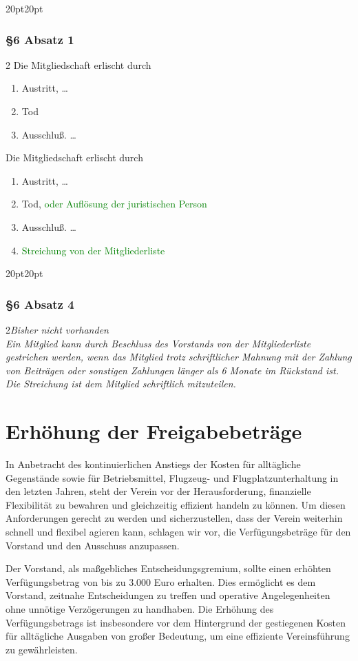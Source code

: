 \documentclass[10pt,a4paper,parskip=half]{scrartcl}
\newcommand{\new}[1]{\textcolor{Green}{#1}}
\newcommand{\change}[1]{
  \begin{adjustwidth}{20pt}{20pt}
    #1
  \end{adjustwidth}
}
\newcommand{\compare}[3]{\change{\subsubsection*{#1}\begin{multicols}{2}#2\columnbreak\\#3\end{multicols}}}
\begin{document}
  \change{
  \subsubsection*{§6 Absatz 1}
  \begin{multicols}{2}
  Die Mitgliedschaft erlischt durch
  \begin{enumerate}[label=\alph*)]
    \item Austritt, \dots
    \item Tod
    \item{Ausschluß.} \dots
  \end{enumerate}
  \columnbreak
  Die Mitgliedschaft erlischt durch
  \begin{enumerate}[label=\alph*)]
    \item Austritt, \dots
    \item Tod, \new{oder Auflösung der juristischen Person}
    \item{Ausschluß.} \dots
    \item \new{Streichung von der Mitgliederliste}
  \end{enumerate}
\end{multicols}
  }
\compare{§6 Absatz 4}{\em Bisher nicht vorhanden \em}{Ein Mitglied kann durch Beschluss des Vorstands von der Mitgliederliste gestrichen werden,
wenn das Mitglied trotz schriftlicher Mahnung mit der Zahlung von Beiträgen oder sonstigen Zahlungen länger als 6 Monate im Rückstand ist.
Die Streichung ist dem Mitglied schriftlich mitzuteilen.}


  \section{Erhöhung der Freigabebeträge}
  In Anbetracht des kontinuierlichen Anstiegs der Kosten für alltägliche Gegenstände sowie für Betriebsmittel, Flugzeug- und Flugplatzunterhaltung in den letzten Jahren, steht der Verein vor der Herausforderung, finanzielle Flexibilität zu bewahren und gleichzeitig effizient handeln zu können. Um diesen Anforderungen gerecht zu werden und sicherzustellen, dass der Verein weiterhin schnell und flexibel agieren kann, schlagen wir vor, die Verfügungsbeträge für den Vorstand und den Ausschuss anzupassen.

  Der Vorstand, als maßgebliches Entscheidungsgremium, sollte einen erhöhten Verfügungsbetrag von bis zu 3.000 Euro erhalten. Dies ermöglicht es dem Vorstand, zeitnahe Entscheidungen zu treffen und operative Angelegenheiten ohne unnötige Verzögerungen zu handhaben. Die Erhöhung des Verfügungsbetrags ist insbesondere vor dem Hintergrund der gestiegenen Kosten für alltägliche Ausgaben von großer Bedeutung, um eine effiziente Vereinsführung zu gewährleisten.
  
\end{document}
